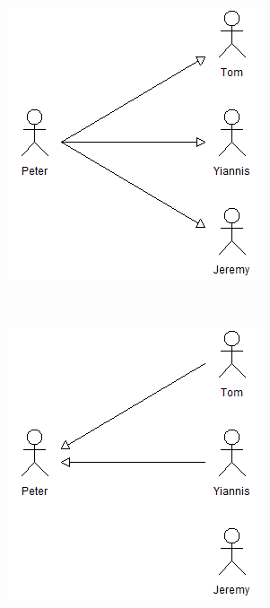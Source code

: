 \begin{figure}[h!]
        \begin{subfigure}[b]{0.3\textwidth}
                \centering
                \includegraphics[width=\textwidth]{img/protocol1.png}
				\caption{}
				\label{subfig:protocol1}
        \end{subfigure}%
        ~ %
        \begin{subfigure}[b]{0.3\textwidth}
                \centering
                \includegraphics[width=\textwidth]{img/protocol2.png}

\end{subfigure}
\end{figure}

